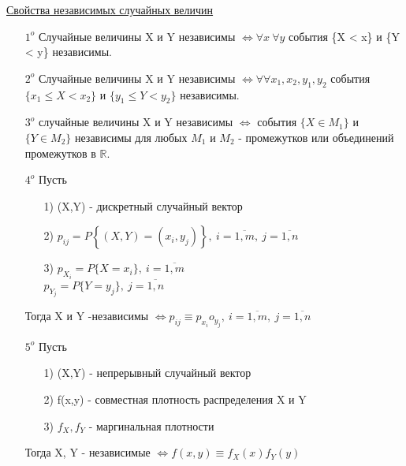 \underline{Свойства независимых случайных величин} 
\begin{enumerate}
\item[$1^o$] Случайные величины X и Y независимы $\Leftrightarrow \forall x \ \forall y$ события \{X < x\} и \{Y < y\} независимы.

\item[$2^o$] Случайные величины X и Y независимы $\Leftrightarrow \forall \forall x_1, x_2, y_1, y_2$ события $\{x_1 \leqslant X < x_2\}$ и $\{y_1 \leqslant Y < y_2\}$ независимы.

\item[$3^o$] случайные величины X и Y независимы $\Leftrightarrow$ события $\{X \in M_1\}$ и $\{Y \in M_2\}$ независимы для любых $M_1$ и $M_2$ - промежутков или объединений промежутков в $\mathbb{R}$.

\item[$4^o$] Пусть
	\begin{enumerate}
	\item[1)] (X,Y) - дискретный случайный вектор
	\item[2)] $p_{ij} = P\left\{ (X,Y) = (x_i, y_j) \right\}, \ i = \overline{1,m}, \ j = \overline{1,n}$
	\item[3)] $p_{X_i} = P\{X = x_i\}, \ i = \overline{1,m}$ \\
	$p_{Y_j} = P\{Y = y_j\}, \ j = \overline{1,n}$ \\
	\end{enumerate}
Тогда X и Y -независимы $\Leftrightarrow p_{ij} \equiv p_{x_i} o_{y_j}, \ i = \overline{1,m}, \ j = \overline{1,n}$

\item[$5^o$] Пусть
	\begin{enumerate}
	\item[1)] (X,Y) - непрерывный случайный вектор
	\item[2)] f(x,y) - совместная плотность распределения X и Y
	\item[3)] $f_X, f_Y$ - маргинальная плотности
	\end{enumerate}
Тогда X, Y - независимые $\Leftrightarrow f(x,y) \equiv f_X (x) f_Y (y)$
\end{enumerate}


